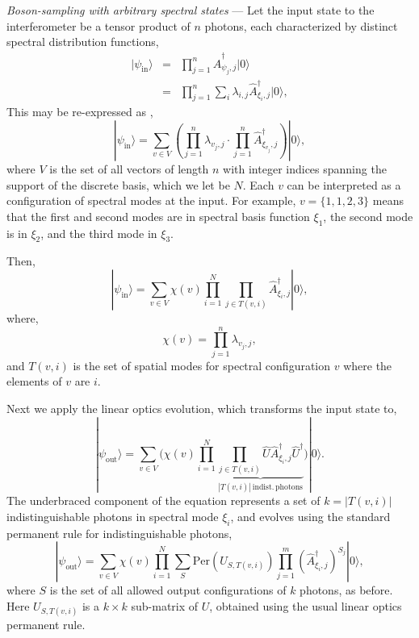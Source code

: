 \documentclass[aps,prl,twocolumn,amsmath,amssymb,nofootinbib,superscriptaddress]{revtex4}
\newcommand{\ket}[1]{|#1\rangle}
\begin{document}
\emph{Boson-sampling with arbitrary spectral states} --- Let the input state to the interferometer be a tensor product of $n$ photons, each characterized by distinct spectral distribution functions,
\begin{eqnarray}
\ket{\psi_\mathrm{in}} &=& \prod_{j=1}^n \hat{A}_{\psi_j,j}^\dag \ket{0} \nonumber \\
&=& \prod_{j=1}^n \sum_i \lambda_{i,j} \hat{A}_{\xi_i,j}^\dag \ket{0},
\end{eqnarray}
This may be re-expressed as \cite{bib:RohdeLowFid12},
\begin{equation}
\ket{\psi_\mathrm{in}} = \sum_{v\in V} \left(\prod_{j=1}^n \lambda_{v_j,j} \cdot \prod_{j=1}^n \hat{A}_{\xi_{v_j},j}^\dag \right) \ket{0},
\end{equation}
where $V$ is the set of all vectors of length $n$ with integer indices spanning the support of the discrete basis, which we let be $N$. Each $v$ can be interpreted as a configuration of spectral modes at the input. For example, \mbox{$v=\{1,1,2,3\}$} means that the first and second modes are in spectral basis function $\xi_1$, the second mode is in $\xi_2$, and the third mode in $\xi_3$.

Then,
\begin{equation}
\ket{\psi_\mathrm{in}} = \sum_{v\in V} \chi(v) \prod_{i=1}^N \prod_{j\in T(v,i)} \hat{A}_{\xi_i,j}^\dag \ket{0},
\end{equation}
where,
\begin{equation}
\chi(v) = \prod_{j=1}^n \lambda_{v_j,j},
\end{equation}
and \mbox{$T(v,i)$} is the set of spatial modes for spectral configuration $v$ where the elements of $v$ are $i$.

Next we apply the linear optics evolution, which transforms the input state to,
\begin{equation}
\ket{\psi_\mathrm{out}} = \sum_{v\in V} \Bigg(\chi(v) \prod_{i=1}^N \underbrace{\prod_{j\in T(v,i)} \hat{U} \hat{A}_{\xi_i,j}^\dag \hat{U}^\dag}_{|T(v,i)|\,\mathrm{indist.\,photons}} \Bigg) \ket{0}.
\end{equation}
The underbraced component of the equation represents a set of $k=|T(v,i)|$ indistinguishable photons in spectral mode $\xi_i$, and evolves using the standard permanent rule for indistinguishable photons,
\begin{equation} \label{eq:generalOut}
\ket{\psi_\mathrm{out}} = \sum_{v\in V} \chi(v) \prod_{i=1}^N \sum_S \mathrm{Per}\left(U_{S,T(v,i)}\right) \prod_{j=1}^m \left(\hat{A}^\dag_{\xi_i,j}\right)^{S_j} \ket{0},
\end{equation}
where $S$ is the set of all allowed output configurations of $k$ photons, as before. Here \mbox{$U_{S,T(v,i)}$} is a \mbox{$k\times k$} sub-matrix of $U$, obtained using the usual linear optics permanent rule.
\end{document}
